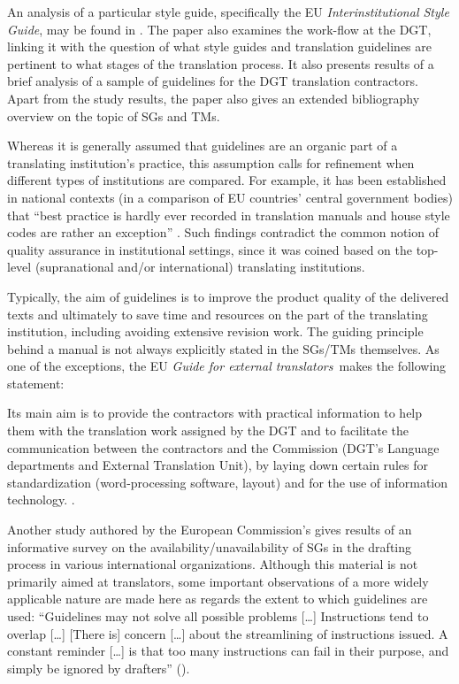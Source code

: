 \documentclass[output=paper]{langsci/langscibook}
\begin{document}
An analysis of a particular style guide, specifically the EU \textit{Interinstitutional Style Guide}, may be found in \citet{Svoboda2013}. The paper also examines the work-flow at the DGT, linking it with the question of what style guides and translation guidelines are pertinent to what stages of the translation process. It also presents results of a brief analysis of a sample of guidelines for the DGT translation contractors. Apart from the study results, the paper also gives an extended bibliography overview on the topic of SGs and TMs.

Whereas it is generally assumed that guidelines are an organic part of a translating institution’s practice, this assumption calls for refinement when different types of institutions are compared. For example, it has been established in national contexts (in a comparison of EU countries’ central government bodies) that “best practice is hardly ever recorded in translation manuals and house style codes are rather an exception” \citep{Svoboda2017forthcoming}. Such findings contradict the common notion of quality assurance in institutional settings, since it was coined based on the top-level (supranational and/or international) translating institutions.

Typically, the aim of guidelines is to improve the product quality of the delivered texts and ultimately to save time and resources on the part of the translating institution, including avoiding extensive revision work. The guiding principle behind a manual is not always explicitly stated in the SGs/TMs themselves. As one of the exceptions, the EU \textit{Guide for external translators}~makes the following statement:

Its main aim is to provide the contractors with practical information to help them with the translation work assigned by the DGT and to facilitate the communication between the contractors and the Commission (DGT’s Language departments and External Translation Unit), by laying down certain rules for standardization (word-processing software, layout) and for the use of information technology. \citep[4]{DGT2008}.

Another study authored by the European Commission’s \citet[175–186]{DGT2013} gives results of an informative survey on the availability/unavailability of SGs in the drafting process in various international organizations. Although this material is not primarily aimed at translators, some important observations of a more widely applicable nature are made here as regards the extent to which guidelines are used: “Guidelines may not solve all possible problems […] Instructions tend to overlap […] [There is] concern […] about the streamlining of instructions issued. A constant reminder […] is that too many instructions can fail in their purpose, and simply be ignored by drafters” (\citeyear[175]{DGT2013}).
\end{document}
